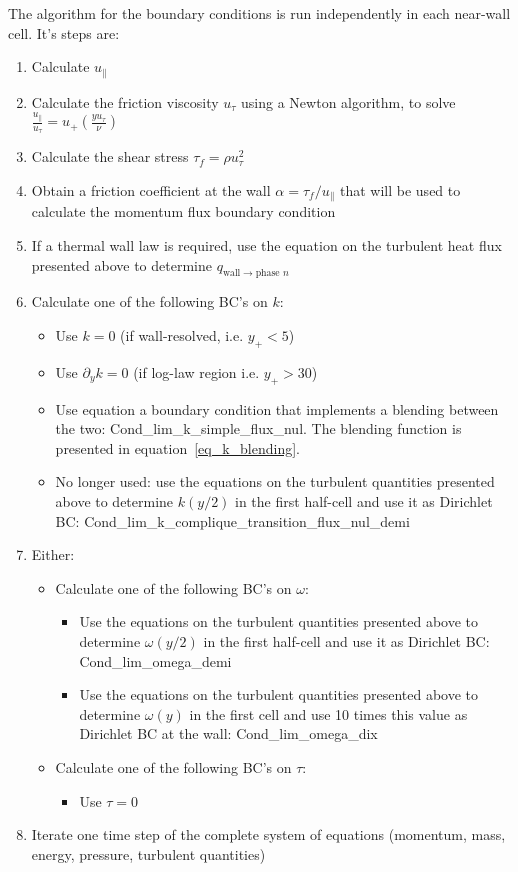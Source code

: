 The algorithm for the boundary conditions is run independently in each near-wall cell. 
It's steps are:
\begin{enumerate}
	\item Calculate $u_\parallel$
	\item Calculate the friction viscosity $u_\tau$ using a Newton algorithm, to solve $\frac{u_\parallel}{u_\tau} = u_+(\frac{y u_\tau}{\nu})$
	\item Calculate the shear stress $\tau_f = \rho u_\tau^2$
	\item Obtain a friction coefficient at the wall $\alpha = \tau_f / u_\parallel$ that will be used to calculate the momentum flux boundary condition
	\item If a thermal wall law is required, use the equation on the turbulent heat flux presented above to determine $q_{\text{wall}\rightarrow\text{phase~}n}$
	\item Calculate one of the following BC's on $k$:
	\begin{itemize}
		\item Use $k=0$ (if wall-resolved, i.e. $y_+<5$)
		\item Use $\partial_y k=0$ (if log-law region i.e. $y_+>30$)
		\item Use equation a boundary condition that implements a blending between the two: Cond\_lim\_k\_simple\_flux\_nul. The blending function is presented in equation~\eqref{eq_k_blending}.
		\item No longer used: use the equations on the turbulent quantities presented above to determine $k(y/2)$ in the first half-cell and use it as Dirichlet BC: Cond\_lim\_k\_complique\_transition\_flux\_nul\_demi
	\end{itemize} 
	\item Either:
	\begin{itemize}
		\item Calculate one of the following BC's on $\omega$:
		\begin{itemize}
			\item Use the equations on the turbulent quantities presented above to determine $\omega(y/2)$ in the first half-cell and use it as Dirichlet BC: Cond\_lim\_omega\_demi
			\item Use the equations on the turbulent quantities presented above to determine $\omega(y)$ in the first cell and use 10 times this value as Dirichlet BC at the wall: Cond\_lim\_omega\_dix
		\end{itemize}
		\item Calculate one of the following BC's on $\tau$:
		\begin{itemize}
			\item Use $\tau = 0$
		\end{itemize}
	\end{itemize}
	\item Iterate one time step of the complete system of equations (momentum, mass, energy, pressure, turbulent quantities)
\end{enumerate}

